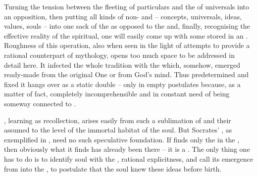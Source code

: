 \label{anamnesis}
%
Turning the tension between the fleeting  of particulars and the
 of universals into an opposition, then putting all kinds of
non- and  -- concepts, universals, ideas,
values, souls -- into one sack of the  as opposed to the
 and, finally, recognising the effective reality of the
spiritual, one will easily come up with some  stored
in an . Roughness of this operation, also when
seen in the light of attempts to provide a rational counterpart of mythology,
opens too much space to be addressed in detail here. It infected the whole
tradition with the  which, somehow, emerged
ready-made from the {original One} or from God's mind. Thus
predetermined and fixed it hangs over  as a static double --
 only in empty postulates because, as a matter of fact,
completely incomprehensible and in constant need of being someway connected to
.

, learning as recollection, arises easily from such a sublimation
of  and their assumed  to the level of the immortal
habitat of the soul. But Socrates' , as
exemplified in , need no such speculative foundation.  If
 finds only the  in the , then
obviously what it finds has already been there -- it is a .  The
only thing one has to do is to identify soul with the ,
rational explicitness, and call its emergence from  into the
 , to postulate that the soul knew these ideas before
birth.

